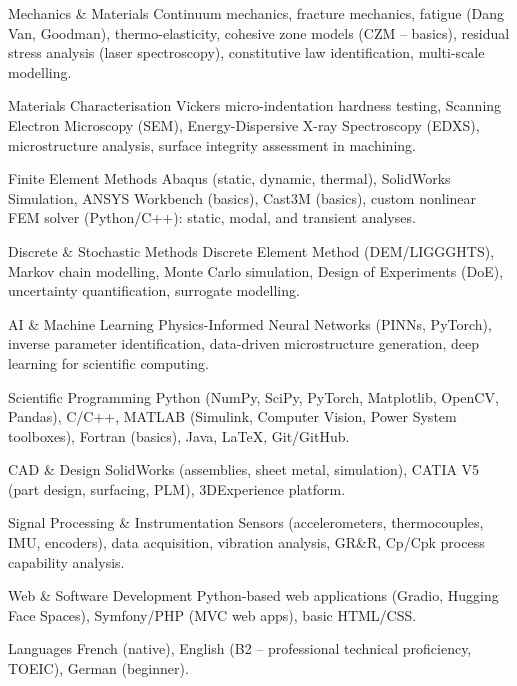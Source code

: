 \documentclass[11pt, a4paper]{awesome-cv}
\begin{document}
\begin{cvskills}

  \cvskill
    {Mechanics \& Materials}
    {Continuum mechanics, fracture mechanics, fatigue (Dang Van, Goodman), thermo-elasticity, cohesive zone models (CZM – basics), residual stress analysis (laser spectroscopy), constitutive law identification, multi-scale modelling.}

  \cvskill
    {Materials Characterisation}
    {Vickers micro-indentation hardness testing, Scanning Electron Microscopy (SEM), Energy-Dispersive X-ray Spectroscopy (EDXS), microstructure analysis, surface integrity assessment in machining.}

  \cvskill
    {Finite Element Methods}
    {Abaqus (static, dynamic, thermal), SolidWorks Simulation, ANSYS Workbench (basics), Cast3M (basics), custom nonlinear FEM solver (Python/C++): static, modal, and transient analyses.}

  \cvskill
    {Discrete \& Stochastic Methods}
    {Discrete Element Method (DEM/LIGGGHTS), Markov chain modelling, Monte Carlo simulation, Design of Experiments (DoE), uncertainty quantification, surrogate modelling.}

  \cvskill
    {AI \& Machine Learning}
    {Physics-Informed Neural Networks (PINNs, PyTorch), inverse parameter identification, data-driven microstructure generation, deep learning for scientific computing.}

  \cvskill
    {Scientific Programming}
    {Python (NumPy, SciPy, PyTorch, Matplotlib, OpenCV, Pandas), C/C++, MATLAB (Simulink, Computer Vision, Power System toolboxes), Fortran (basics), Java, LaTeX, Git/GitHub.}

  \cvskill
    {CAD \& Design}
    {SolidWorks (assemblies, sheet metal, simulation), CATIA V5 (part design, surfacing, PLM), 3DExperience platform.}

  \cvskill
    {Signal Processing \& Instrumentation}
    {Sensors (accelerometers, thermocouples, IMU, encoders), data acquisition, vibration analysis, GR\&R, Cp/Cpk process capability analysis.}

  \cvskill
    {Web \& Software Development}
    {Python-based web applications (Gradio, Hugging Face Spaces), Symfony/PHP (MVC web apps), basic HTML/CSS.}

  \cvskill
    {Languages}
    {French (native), English (B2 – professional technical proficiency, TOEIC), German (beginner).}

\end{cvskills}
\end{document}
